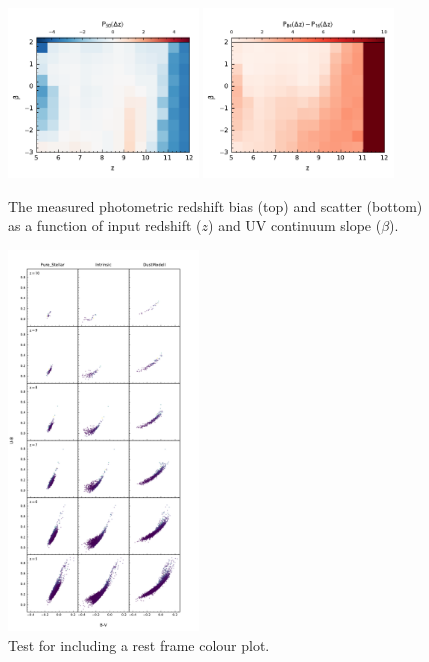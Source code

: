 \begin{figure}
	\centering
	\includegraphics[width=0.45\textwidth]{./figures/beta_bias.pdf}
  \includegraphics[width=0.45\textwidth]{./figures/beta_scatter.pdf}
	\caption{The measured photometric redshift bias (top) and scatter (bottom) as a function of input redshift ($z$) and UV continuum slope ($\beta$). \label{fig:beta_bias_scatter}}
\end{figure}

\begin{figure}
	\centering
	\includegraphics[width=0.45\textwidth]{./figures/colours_rest.pdf}
	\caption{Test for including a rest frame colour plot. \label{fig:colours_rest}}
\end{figure}